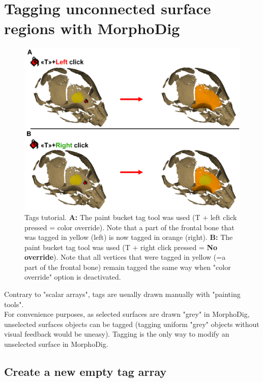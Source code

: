 \documentclass[12pt, a4paper]{book}
\begin{document}
\section{Tagging unconnected surface regions with MorphoDig}

\begin{figure}
  \centering
  \includegraphics[scale=0.2]{tag_tutorial.png}
\caption{Tags tutorial. \textbf{A:} The paint bucket tag tool was used (T + left click pressed = color override). Note that a part of the frontal bone that was tagged in yellow (left) is now tagged in orange (right).   \textbf{B:} The paint bucket tag tool was used (T + right click pressed = \textbf{No override}). Note that all vertices that were tagged in yellow  (=a part of the frontal bone) remain tagged the same way when "color override" option is deactivated.}	
\label{tag_tutorial}
 \end{figure}


Contrary to "scalar arrays", tags are usually drawn manually with "painting tools". \\
For convenience purposes, as selected surfaces are drawn "grey" in MorphoDig, unselected surfaces objects can be tagged (tagging uniform "grey" objects without visual feedback would be uneasy). Tagging is the only way to modify an unselected surface in MorphoDig. \\
\subsection{Create a new empty tag array}\label{empty_tag_array}
\end{document}
